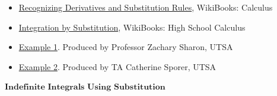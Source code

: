 \begin{itemize}
    \item \href{https://en.wikibooks.org/wiki/Calculus/Integration_techniques/Recognizing_Derivatives_and_the_Substitution_Rule}{Recognizing Derivatives and Substitution Rules}, WikiBooks: Calculus
    \item \href{https://en.wikibooks.org/wiki/High_School_Calculus/Integration_by_Substitution}{Integration by Substitution}, WikiBooks: High School Calculus
    \item \href{https://www.youtube.com/watch?v=uoCW8S-I9Es}{Example 1}. Produced by Professor Zachary Sharon, UTSA
    \item \href{https://www.youtube.com/watch?v=zqMxMtjbaBE}{Example 2}. Produced by TA Catherine Sporer, UTSA
\end{itemize}

$\textbf{Indefinite Integrals Using

Substitution}$



